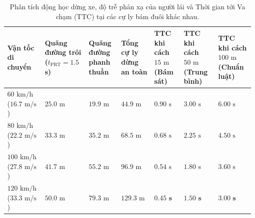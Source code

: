 \documentclass[a4paper]{article}
\begin{document}
\begin{table}[H]
    \centering
    \footnotesize
    \begin{tabularx}{\textwidth}{|>{\raggedright\arraybackslash}p{1.9cm}|>{\centering\arraybackslash}p{1.8cm}|>{\centering\arraybackslash}p{1.7cm}|>{\centering\arraybackslash}p{1.8cm}|>{\centering\arraybackslash}p{1.7cm}|>{\centering\arraybackslash}p{1.7cm}|>{\centering\arraybackslash}X|}
        \hline
        \textbf{Vận tốc di chuyển} & \textbf{Quãng đường trôi ($t_{\text{PRT}} = 1.5$s)} & \textbf{Quãng đường phanh thuần} & \textbf{Tổng cự ly dừng an toàn} & \textbf{TTC khi cách $15\text{ m}$ (Bám sát)} & \textbf{TTC khi cách $50\text{ m}$ (Trung bình)} & \textbf{TTC khi cách $100\text{ m}$ (Chuẩn luật)} \\
        \hline
        $60 \text{ km/h}$ ($16.7 \text{ m/s}$) & $25.0 \text{ m}$ & $19.9 \text{ m}$ & $44.9 \text{ m}$ & $0.90 \text{ s}$ & $3.00 \text{ s}$ & $6.00 \text{ s}$ \\
        \hline
        $80 \text{ km/h}$ ($22.2 \text{ m/s}$) & $33.3 \text{ m}$ & $35.2 \text{ m}$ & $68.5 \text{ m}$ & $0.68 \text{ s}$ & $2.25 \text{ s}$ & $4.50 \text{ s}$ \\
        \hline
        $100 \text{ km/h}$ ($27.8 \text{ m/s}$) & $41.7 \text{ m}$ & $55.2 \text{ m}$ & $96.9 \text{ m}$ & $0.54 \text{ s}$ & $1.80 \text{ s}$ & $3.60 \text{ s}$ \\
        \hline
        $120 \text{ km/h}$ ($33.3 \text{ m/s}$) & $50.0 \text{ m}$ & $79.3 \text{ m}$ & $129.3 \text{ m}$ & $\mathbf{0.45 \text{ s}}$ & $\mathbf{1.50 \text{ s}}$ & $\mathbf{3.00 \text{ s}}$ \\
        \hline
    \end{tabularx}
    \caption{Phân tích động học dừng xe, độ trễ phản xạ của người lái và Thời gian tới Va chạm (TTC) tại các cự ly bám đuôi khác nhau.}
    \label{tab:kinematics_reaction}
\end{table}
\end{document}
